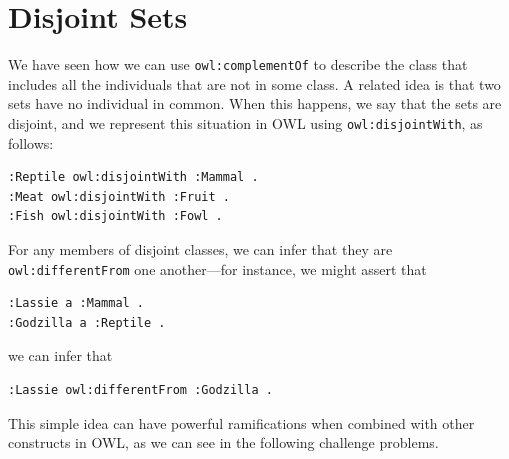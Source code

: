 \section{Disjoint Sets}

We have seen how we can use \texttt{owl:complementOf} to describe the class that
includes all the individuals that are not in some class. A related idea
is that two sets have no individual in common. When this happens, we say
that the sets are disjoint, and we represent this situation in OWL using
\texttt{owl:disjointWith}, as follows:

\begin{lstlisting}
:Reptile owl:disjointWith :Mammal .
:Meat owl:disjointWith :Fruit .
:Fish owl:disjointWith :Fowl .
\end{lstlisting}

For any members of disjoint classes, we can infer that they are
\texttt{owl:differentFrom} one another---for instance, we might assert that

\begin{lstlisting}
:Lassie a :Mammal .
:Godzilla a :Reptile .
\end{lstlisting}

we can infer that

\begin{lstlisting}
:Lassie owl:differentFrom :Godzilla .
\end{lstlisting}

This simple idea can have powerful ramifications when combined with
other constructs in OWL, as we can see in the following challenge
problems.

